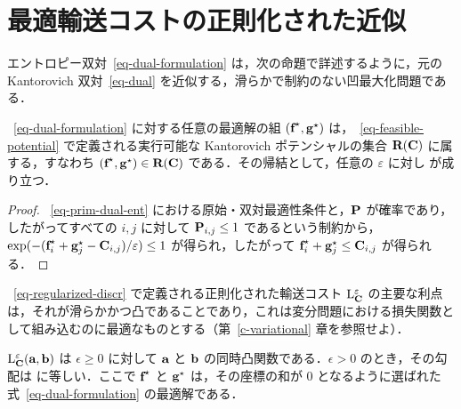 \section{最適輸送コストの正則化された近似}
\label{sec-regularized-cost}

エントロピー双対~\eqref{eq-dual-formulation} は，次の命題で詳述するように，元の Kantorovich 双対~\eqref{eq-dual} を近似する，滑らかで制約のない凹最大化問題である．

\begin{prop}\label{prop-feasibility-dual}
~\eqref{eq-dual-formulation} に対する任意の最適解の組 $(\fD^\star,\gD^\star)$ は，~\eqref{eq-feasible-potential} で定義される実行可能な Kantorovich ポテンシャルの集合 $\PotentialsD(\C)$ に属する，すなわち $(\fD^\star,\gD^\star) \in \PotentialsD(\C)$ である．その帰結として，任意の $\varepsilon$ に対し
が成り立つ．
\end{prop}
\begin{proof}
	~\eqref{eq-prim-dual-ent} における原始・双対最適性条件と，$\P$ が確率であり，したがってすべての $i,j$ に対して $\P_{i,j}\leq 1$ であるという制約から，$\exp(-(\fD^\star_i+\gD^\star_j-\C_{i,j})/\varepsilon)\leq 1$ が得られ，したがって $\fD^\star_i+\gD^\star_j\leq\C_{i,j}$ が得られる．
\end{proof}

~\eqref{eq-regularized-discr} で定義される正則化された輸送コスト $\MKD_\C^\varepsilon$ の主要な利点は，それが滑らかかつ凸であることであり，これは変分問題における損失関数として組み込むのに最適なものとする（第~\ref{c-variational} 章を参照せよ）．

\begin{prop}\label{prop-convexity-dual}
$\MKD_\C^\varepsilon(\a,\b)$ は $\epsilon\geq 0$ に対して $\a$ と $\b$ の同時凸関数である．$\epsilon>0$ のとき，その勾配は
\eq{
	\nabla\MKD_\C^\varepsilon(\a,\b)= \begin{bmatrix} \fD^\star \\ \gD^\star \end{bmatrix},
}
に等しい．ここで $\fD^\star$ と $\gD^\star$ は，その座標の和が $0$ となるように選ばれた式~\eqref{eq-dual-formulation} の最適解である．
\end{prop}



